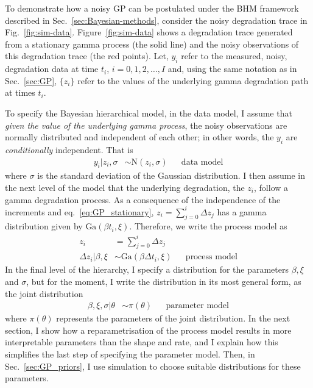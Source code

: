 To demonstrate how a noisy GP can be postulated under the BHM framework described in Sec.~\ref{sec:Bayesian-methods}, consider the noisy degradation trace in Fig.~\ref{fig:sim-data}. Figure~\ref{fig:sim-data} shows a degradation trace generated from a stationary gamma process (the solid line) and the noisy observations of this degradation trace (the red points). Let, $y_i$ refer to the measured, noisy, degradation data at time $t_i$, $i = 0, 1, 2, \ldots, I$ and, using the same notation as in Sec.~\ref{sec:GP}, $\{ z_i \}$ refer to the values of the underlying gamma degradation path at times $t_i$.

To specify the Bayesian hierarchical model, in the data model, I assume that \emph{given the value of the underlying gamma process}, the noisy observations are normally distributed and independent of each other; in other words, the $y_i$ are \emph{conditionally} independent. That is
\begin{align*}
 y_i|z_i, \sigma & \sim \mbox{N}(z_i, \sigma)  && \mbox{data model}
\end{align*}
where $\sigma$ is the standard deviation of the Gaussian distribution. I then assume in the next level of the model that the underlying degradation, the $z_i$, follow a gamma degradation process. As a consequence of the independence of the increments and eq.~\eqref{eq:GP_stationary}, $z_i = \sum_{j = 0}^i \Delta z_j$ has a gamma distribution given by $\mbox{Ga}(\beta t_i, \xi)$. Therefore, we write the process model as
\begin{align*}
 z_i & = \sum_{j=0}^i \Delta z_j \\ 
  \Delta z_i | \beta, \xi & \sim \mbox{Ga}(\beta \Delta t_i, \xi) && \mbox{process model}
\end{align*}
In the final level of the hierarchy, I specify a distribution for the parameters $\beta, \xi$ and $\sigma$, but for the moment, I write the distribution in its most general form, as the joint distribution
\begin{align*}
    \beta, \xi, \sigma | \theta & \sim \pi(\theta) && \mbox{parameter model}
\end{align*}
where $\pi(\theta)$ represents the parameters of the joint distribution. In the next section, I show how a reparametrisation of the process model results in more interpretable parameters than the shape and rate, and I explain how this simplifies the last step of specifying the parameter model. Then, in Sec.~\ref{sec:GP_priors}, I use simulation to choose suitable distributions for these parameters.

